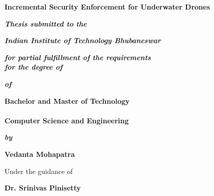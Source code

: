 \begin{titlepage}
\thispagestyle{empty}
\begin{center}
{\Large  \bf Incremental Security Enforcement for Underwater Drones}
\end{center}
 \vspace{0.1em}
\begin{center}
 \textbf{\textit{Thesis submitted to the}}
\end{center}
 \vspace{-3em}
\begin{center}
 \textbf{\textit{Indian Institute of Technology  Bhubaneswar}} 
\end{center}
 \vspace{-3em}
\begin{center}
 \textbf{\textit{for partial fulfillment of the requirements}} \\
 \textbf{\textit{for the degree of}} 
\end{center}
 \vspace{-1em}
\begin{center}
 \textbf{\textit{of}}
\end{center}
 \vspace{-1em}
\begin{center}
 \textbf{\large Bachelor and Master of Technology} \\
  \\
 \textbf{\large Computer Science and Engineering}
\end{center}
 \vspace{-1em}
\begin{center}
 \textbf{\textit{by}}
\end{center}
 \vspace{-1em}
\begin{center}
 \large{\textbf{Vedanta Mohapatra}}
\end{center}
 \vspace{-1em}
\begin{center}
 Under the guidance of
\end{center}
 \vspace{-1em}
\begin{center}
 \textbf{Dr. Srinivas Pinisetty}
\end{center}
 \vspace{-1em}

\end{titlepage}
